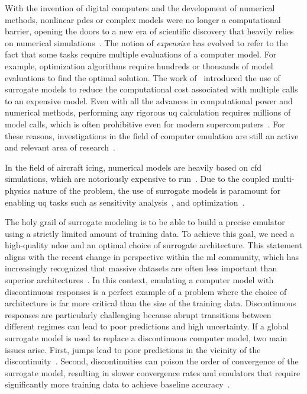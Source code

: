 \smallskip
With the invention of digital computers and the development of numerical methods, nonlinear \glspl{pde} or complex models were no longer a computational barrier, opening the doors to a new era of scientific discovery that heavily relies on numerical simulations~\cite{uq_theory}. The notion of \textit{expensive} has evolved to refer to the fact that some tasks require multiple evaluations of a computer model. For example, optimization algorithms require hundreds or thousands of model evaluations to find the optimal solution. The work of~\cite{jones1998} introduced the use of surrogate models to reduce the computational cost associated with multiple calls to an expensive model. Even with all the advances in computational power and numerical methods, performing any rigorous \gls{uq} calculation requires millions of model calls, which is often prohibitive even for modern supercomputers~\cite{uq_theory}. For these reasons, investigations in the field of computer emulation are still an active and relevant area of research~\cite{rumsey2026}.

\smallskip
In the field of aircraft icing, numerical models are heavily based on \gls{cfd} simulations, which are notoriously expensive to run~\cite{ransles}. Due to the coupled multi-physics nature of the problem, the use of surrogate models is paramount for enabling \gls{uq} tasks such as sensitivity analysis~\cite{Bellosta2021}, and optimization~\cite{GoriGallia2024}. 

\smallskip
The holy grail of surrogate modeling is to be able to build a precise emulator using a strictly limited amount of training data. To achieve this goal, we need a high-quality \gls{ndoe} and an optimal choice of surrogate architecture. This statement aligns with the recent change in perspective within the \gls{ml} community, which has increasingly recognized that massive datasets are often less important than superior architectures~\cite{gunasekar2023textbooksneed, bettermodel, jumper2021highly}. In this context, emulating a computer model with discontinuous responses is a perfect example of a problem where the choice of architecture is far more critical than the size of the training data. Discontinuous responses are particularly challenging because abrupt transitions between different regimes can lead to poor predictions and high uncertainty. If a global surrogate model is used to replace a discontinuous computer model, two main issues arise. First, jumps lead to poor predictions in the vicinity of the discontinuity~\cite{Sudret2023}. Second, discontinuities can poison the order of convergence of the surrogate model, resulting in slower convergence rates and emulators that require significantly more training data to achieve baseline accuracy~\cite{Gori2022}. 

